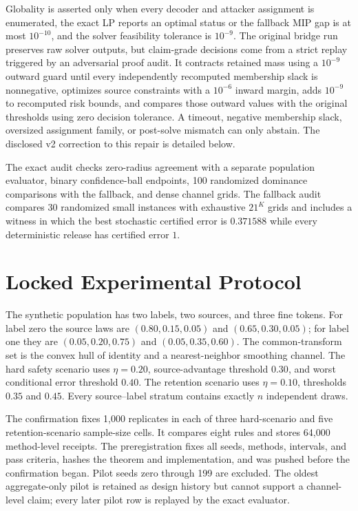 Globality is asserted only when every decoder and attacker assignment is
enumerated, the exact LP reports an optimal status or the fallback MIP gap is
at most $10^{-10}$, and the solver feasibility tolerance is $10^{-9}$.
The original bridge run preserves raw solver outputs, but claim-grade decisions
come from a strict replay triggered by an adversarial proof audit. It contracts
retained mass using a $10^{-9}$ outward guard until every independently
recomputed membership slack is nonnegative, optimizes source constraints with
a $10^{-6}$ inward margin, adds $10^{-9}$ to recomputed risk bounds, and
compares those outward values with the original thresholds using zero decision
tolerance. A timeout, negative membership slack, oversized assignment family,
or post-solve mismatch can only abstain. The disclosed v2 correction to this
repair is detailed below.

The exact audit checks zero-radius agreement with a separate population
evaluator, binary confidence-ball endpoints, 100 randomized dominance
comparisons with the fallback, and dense channel grids. The fallback audit
compares 30 randomized small instances with exhaustive $21^K$ grids and
includes a witness in which the best stochastic certified error is $0.371588$
while every deterministic release has certified error $1$.

\section{Locked Experimental Protocol}

The synthetic population has two labels, two sources, and three fine tokens.
For label zero the source laws are $(0.80,0.15,0.05)$ and
$(0.65,0.30,0.05)$; for label one they are $(0.05,0.20,0.75)$ and
$(0.05,0.35,0.60)$. The common-transform set is the convex hull of identity and
a nearest-neighbor smoothing channel. The hard safety scenario uses
$\eta=0.20$, source-advantage threshold $0.30$, and worst conditional error
threshold $0.40$. The retention scenario uses $\eta=0.10$, thresholds $0.35$
and $0.45$. Every source--label stratum contains exactly $n$ independent draws.

The confirmation fixes 1,000 replicates in each of three hard-scenario and five
retention-scenario sample-size cells. It compares eight rules and stores 64,000
method-level receipts. The preregistration fixes all seeds, methods, intervals,
and pass criteria, hashes the theorem and implementation, and was pushed before
the confirmation began. Pilot seeds zero through 199 are excluded. The oldest
aggregate-only pilot is retained as design history but cannot support a
channel-level claim; every later pilot row is replayed by the exact evaluator.

